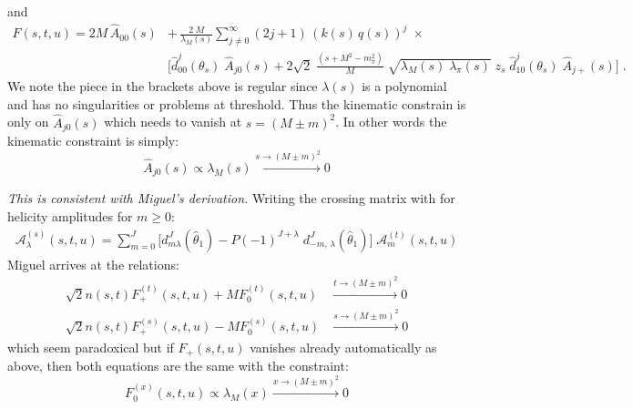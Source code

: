 \documentclass[10pt, aps,prd,amsmath,amssymb,superscriptaddress,onecolumn,
nofootinbib,showpacs,preprintnumbers]{revtex4-1}
\begin{document}
and
\begin{align}
  F(s,t,u) = 2 M \, \hat{A}_{00}(s)
  &+ \, \frac{2 \; M}{\lambda_M(s)}  \sum_{j \not= 0}^\infty (2j+1) \, (k(s)\,q(s))^{j} \;
  \times \nonumber \\
      &\bigg[\hat{d}^j_{00}(\theta_s) \; \hat{A}_{j0}(s)
+  2 \sqrt{2} \; \frac{(s + M^2 - m_\pi^2)}{M} \; \sqrt{\lambda_M(s) \; \lambda_\pi(s)} \;  z_s \; \hat{d}^j_{10}(\theta_s) \; \hat{A}_{j+}(s) \bigg] \; .
\end{align}
We note the piece in the brackets above is regular since \(\lambda(s)\) is a polynomial and has no singularities or problems at threshold. Thus the kinematic constrain is only on \(\hat{A}_{j0}(s)\) which needs to vanish at \(s = (M\pm m)^2\).
In other words the kinematic constraint is simply:
  \begin{equation}
    \hat{A}_{j0}(s) \propto \lambda_M(s) \stackrel{ s \to (M \pm m)^2 } \longrightarrow 0
  \end{equation}

\textit{This is consistent with Miguel's derivation.} Writing the crossing matrix with for helicity amplitudes for \(m\geq 0\):
  \begin{align}
     \mathcal{A}_\lambda^{(s)}(s, t, u) =
       \sum_{m = 0}^J \bigg[ d_{ m \lambda}^J(\hat{\theta}_1) - P (-1)^{J+\lambda} \; d_{-m, \, \lambda }^J(\hat{\theta}_1) \bigg] \; \mathcal{A}_{m}^{(t)}(s,t,u)
  \end{align}
Miguel arrives at the relations:
\begin{subequations}\begin{align}
\sqrt{2} n(s,t) F_+^{(t)}(s,t,u) + M F_0^{(t)}(s,t,u) & \stackrel{ t \to (M \pm m)^2 } \longrightarrow 0\\
\sqrt{2} n(s,t) F_+^{(s)}(s,t,u) - M F_0^{(s)}(s,t,u) & \stackrel{ s \to (M \pm m)^2 } \longrightarrow 0
\end{align}\end{subequations}
which seem paradoxical but if \(F_+(s,t,u)\) vanishes already automatically as above, then both equations are the same with the constraint:
  \begin{equation}
    F_0^{(x)}(s,t,u) \propto \lambda_M(x) \stackrel{ x \to (M \pm m)^2 } \longrightarrow 0
  \end{equation}
\newpage

\end{document}
